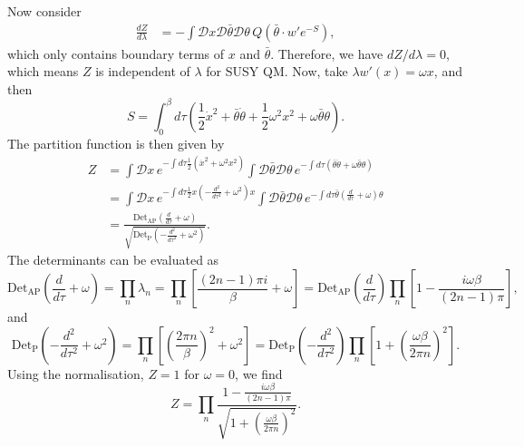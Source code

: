 \begin{solution}
Now consider
\begin{equation}
\begin{aligned}
    \frac{dZ}{d\lambda} &= -\int\mathcal{D}x\mathcal{D}\bar\theta\mathcal{D}\theta \,Q(\bar\theta \cdot w'e^{-S}),
\end{aligned}
\end{equation}
which only contains boundary terms of $x$ and $\bar\theta$. Therefore, we have $dZ/d\lambda = 0$, which means $Z$ is independent of $\lambda$ for SUSY QM. Now, take $\lambda w'(x) = \omega x$, and then
\begin{equation}
    S = \int^\beta_0 d\tau\left(\frac{1}{2}\dot{x}^2 + \bar\theta\dot{\theta} + \frac{1}{2}\omega^2 x^2  + \omega\bar\theta\theta\right).
\end{equation}
The partition function is then given by
\begin{equation}
\begin{aligned}
        Z &= \int\mathcal{D}x\, e^{-\int d\tau \frac{1}{2}(\dot{x}^2 + \omega^2 x^2)}\int\mathcal{D}\bar\theta\mathcal{D}\theta\, e^{-\int d\tau (\bar\theta\dot{\theta} +\omega\bar\theta\theta)} \\
        &= \int\mathcal{D}x\, e^{-\int d\tau \frac{1}{2}x(-\frac{d^2}{d\tau^2} + \omega^2 )x}\int\mathcal{D}\bar\theta\mathcal{D}\theta\, e^{-\int d\tau \bar\theta(\frac{d}{d\tau} +\omega)\theta}\\
        &=\frac{\mathrm{Det}_{\text{AP}}(\frac{d}{d\tau} + \omega)}{\sqrt{\mathrm{Det}_\text{P}(-\frac{d^2}{d\tau^2} + \omega^2)}}.
\end{aligned}
\end{equation}
The determinants can be evaluated as
\begin{equation}
    \mathrm{Det}_{\text{AP}}\left(\frac{d}{d\tau} + \omega\right) = \prod_n\lambda_n = \prod_n\left[\frac{(2n-1)\pi i}{\beta} + \omega\right] = \mathrm{Det}_{\text{AP}}\left(\frac{d}{d\tau}\right)\prod_n\left[1 - \frac{i\omega\beta}{(2n-1)\pi}\right],
\end{equation}
and
\begin{equation}
    \mathrm{Det}_\text{P}\left(-\frac{d^2}{d\tau^2} + \omega^2\right) = \prod_n\left[\left(\frac{2\pi n}{\beta}\right)^2 + \omega^2\right] = \mathrm{Det}_\text{P}\left(-\frac{d^2}{d\tau^2}\right) \prod_n\left[1 + \left(\frac{\omega\beta}{2\pi n}\right)^2\right].
\end{equation}
Using the normalisation, $Z=1$ for $\omega=0$, we find
\begin{equation}
    Z = \prod_n\frac{1 - \frac{i\omega\beta}{(2n-1)\pi}}{\sqrt{1 + \left(\frac{\omega\beta}{2\pi n}\right)^2}}.
\end{equation}
\end{solution}